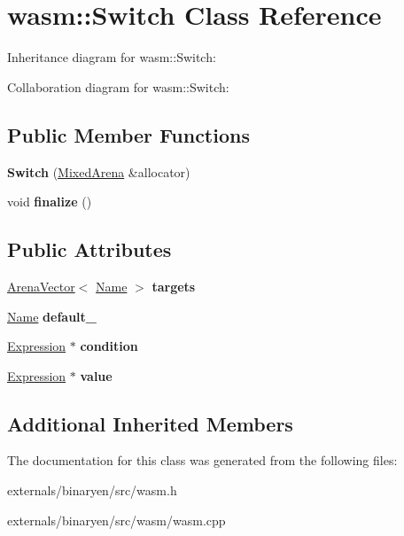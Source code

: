 \hypertarget{classwasm_1_1_switch}{}\section{wasm\+:\+:Switch Class Reference}
\label{classwasm_1_1_switch}


Inheritance diagram for wasm\+:\+:Switch\+:


Collaboration diagram for wasm\+:\+:Switch\+:
\subsection*{Public Member Functions}
\begin{DoxyCompactItemize}
\item 
\mbox{\label{classwasm_1_1_switch_a139c50a1dd2bb7db553332a0a18ff177}} 
{\bfseries Switch} (\mbox{\hyperlink{struct_mixed_arena}{Mixed\+Arena}} \&allocator)
\item 
\mbox{\label{classwasm_1_1_switch_a8b513bf1a0f9dfa36c02c77fad68eef6}} 
void {\bfseries finalize} ()
\end{DoxyCompactItemize}
\subsection*{Public Attributes}
\begin{DoxyCompactItemize}
\item 
\mbox{\label{classwasm_1_1_switch_af91a95e6ea4bba525dcf02ee282d2e2b}} 
\mbox{\hyperlink{class_arena_vector}{Arena\+Vector}}$<$ \mbox{\hyperlink{structwasm_1_1_name}{Name}} $>$ {\bfseries targets}
\item 
\mbox{\label{classwasm_1_1_switch_abb4b5f5873f2b8b4eff1ebbcbe2de46f}} 
\mbox{\hyperlink{structwasm_1_1_name}{Name}} {\bfseries default\+\_\+}
\item 
\mbox{\label{classwasm_1_1_switch_a97f82723aa260826ac0121f3826921ed}} 
\mbox{\hyperlink{classwasm_1_1_expression}{Expression}} $\ast$ {\bfseries condition}
\item 
\mbox{\label{classwasm_1_1_switch_a015e1e0cd2e71c0579ac82b0f55b04e2}} 
\mbox{\hyperlink{classwasm_1_1_expression}{Expression}} $\ast$ {\bfseries value}
\end{DoxyCompactItemize}
\subsection*{Additional Inherited Members}


The documentation for this class was generated from the following files\+:\begin{DoxyCompactItemize}
\item 
externals/binaryen/src/wasm.\+h\item 
externals/binaryen/src/wasm/wasm.\+cpp\end{DoxyCompactItemize}
